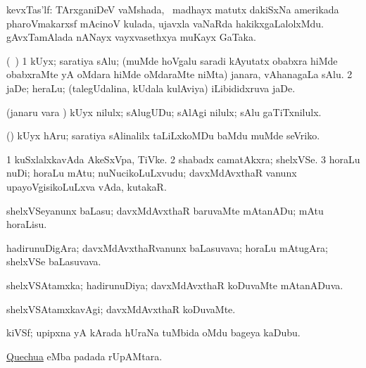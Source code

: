 \bentry
{}
\gl{\nA}
\bmng
kevxTas'lf: 
\banum
{} TArxganiDeV vaMshada, \kanmu\ madhayx matutx dakiSxNa amerikada pharoVmakarxsf mAcinoV kulada, ujavxla vaNaRda hakikxgaLalolxMdu.  
 gAvxTamAlada nANayx vayxvasethxya muKayx GaTaka. 
\eanum
\emng
\eentry

\bentry
{}
\gl{\nA}
\bmng
(\kanmu\ \birx) 
\bnum
\num{1} kUyx; saratiya sAlu; (muMde hoVgalu saradi kAyutatx obabxra hiMde obabxraMte yA oMdara hiMde oMdaraMte niMta) janara, vAhanagaLa sAlu. 
\num{2} jaDe; heraLu; (talegUdalina, kUdala kulAviya) iLibididxruva jaDe. 
\enum
\emng
\eentry

\bentry
{}
\gl{\akirx}
\bmng
(janaru \mo vara \vi) kUyx nilulx; sAlugUDu; sAlAgi nilulx; sAlu gaTiTxnilulx. 
\emng
\eentry

\bentry
{}
\gl{\akirx}
\bmng
(\birx) kUyx hAru; saratiya sAlinalilx taLiLxkoMDu baMdu muMde seVriko. 
\emng
\eentry


\bentry
{}
\gl{\nA}
\bmng
\bnum
\num{1} kuSxlalxkavAda AkeSxVpa, TiVke. 
\num{2} shabadx camatAkxra; shelxVSe. 
\num{3} horaLu nuDi; horaLu mAtu; nuNucikoLuLxvudu; davxMdAvxthaR \mo vanunx upayoVgisikoLuLxva vAda, kutakaR. 
\enum
\emng
\eentry

\bentry
{}
\gl{\akirx}
\bmng
shelxVSeyanunx baLasu; davxMdAvxthaR baruvaMte mAtanADu; mAtu horaLisu. 
\emng
\eentry

\bentry
{}
\gl{\nA}
\bmng
hadirunuDigAra; davxMdAvxthaRvanunx baLasuvava; horaLu mAtugAra; shelxVSe baLasuvava. 
\emng
\eentry

\bentry
{}
\gl{\gu}
\bmng
shelxVSAtamxka; hadirunuDiya; davxMdAvxthaR koDuvaMte mAtanADuva. 
\emng
\eentry

\bentry
{}
\gl{\kirxvi}
\bmng
shelxVSAtamxkavAgi; davxMdAvxthaR koDuvaMte. 
\emng
\eentry

\bentry
{}
\gl{\nA}
\bmng
kiVSf; upipxna yA kArada hUraNa tuMbida oMdu bageya kaDubu. 
\emng
\eentry

\bentry
{}
\gl{\nA}
\bmng
\hyperlink{Quechua}{Quechua} eMba padada rUpAMtara. 
\emng
\eentry

